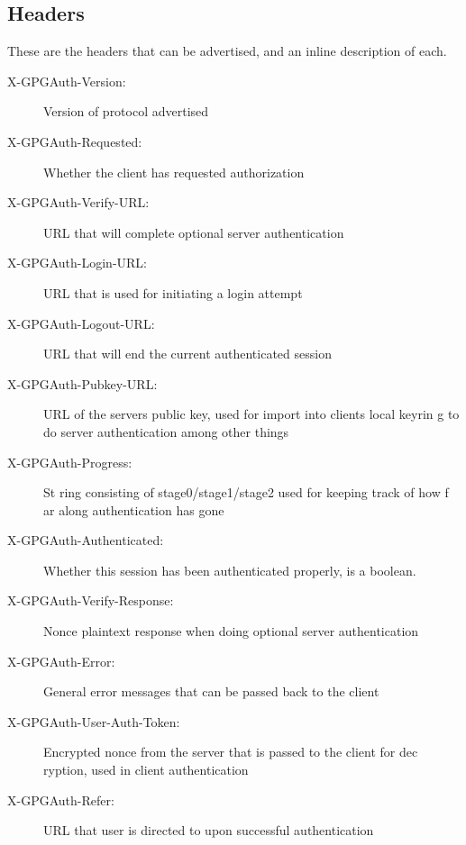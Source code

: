 \documentclass[11pt]{article}
\begin{document}
\subsection{Headers} \label{subsec:headers}
These are the headers that can be advertised, and an inline description of each.
\begin{description}
	\item[X-GPGAuth-Version:] Version of protocol advertised
	\item[X-GPGAuth-Requested:] Whether the client has requested authorization
	\item[X-GPGAuth-Verify-URL:] URL that will complete optional server authentication
	\item[X-GPGAuth-Login-URL:] URL that is used for initiating a login attempt
	\item[X-GPGAuth-Logout-URL:] URL that will end the current authenticated session
	\item[X-GPGAuth-Pubkey-URL:]  URL of the servers public key, used for import into clients local keyrin g to do server authentication among other things
	\item[X-GPGAuth-Progress:] St ring consisting of stage0/stage1/stage2 used for keeping track of how f ar along authentication has gone
	\item[X-GPGAuth-Authenticated:] Whether this session has been authenticated properly, is a boolean. 
	\item[X-GPGAuth-Verify-Response:] Nonce plaintext response when doing optional server authentication 
	\item[X-GPGAuth-Error:] General error messages that can be passed back to the client
	\item[X-GPGAuth-User-Auth-Token:] Encrypted nonce from the server that is passed to the client for dec ryption, used in client authentication
	\item[X-GPGAuth-Refer:] URL that user is directed to upon successful authentication
\end{description}
\end{document}
